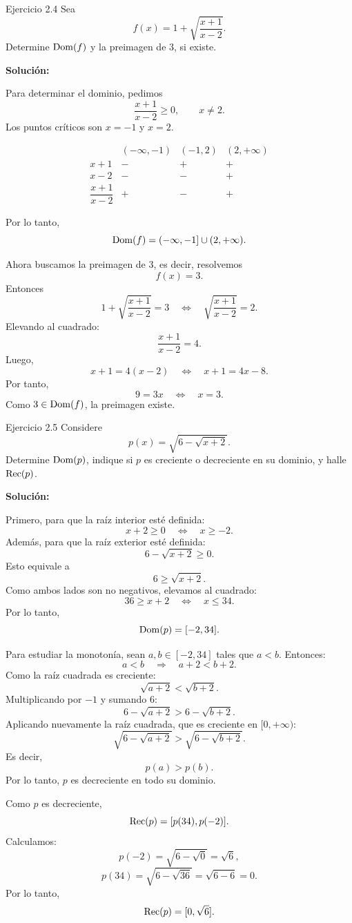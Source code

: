 \documentclass[letterpaper, 12pt]{article}
\begin{document}
\begin{solucionbox}{Ejercicio 2.4}
Sea
\[
    f(x)=1+\sqrt{\frac{x+1}{x-2}}.
\]
Determine $\operatorname{Dom}(f)$ y la preimagen de $3$, si existe.

\textbf{Soluci\'on:}

Para determinar el dominio, pedimos
\[
    \frac{x+1}{x-2}\geq 0,
    \qquad x\neq 2.
\]
Los puntos cr\'iticos son $x=-1$ y $x=2$.

\[
\begin{array}{c|ccc}
    & (-\infty,-1) & (-1,2) & (2,+\infty) \\ \hline
    x+1 & - & + & + \\
    x-2 & - & - & + \\ \hline
    \dfrac{x+1}{x-2} & + & - & +
\end{array}
\]

Por lo tanto,
\[
    \operatorname{Dom}(f)=(-\infty,-1]\cup(2,+\infty).
\]

Ahora buscamos la preimagen de $3$, es decir, resolvemos
\[
    f(x)=3.
\]
Entonces
\[
    1+\sqrt{\frac{x+1}{x-2}}=3
    \quad\Longleftrightarrow\quad
    \sqrt{\frac{x+1}{x-2}}=2.
\]
Elevando al cuadrado:
\[
    \frac{x+1}{x-2}=4.
\]
Luego,
\[
    x+1=4(x-2)
    \quad\Longleftrightarrow\quad
    x+1=4x-8.
\]
Por tanto,
\[
    9=3x
    \quad\Longleftrightarrow\quad
    x=3.
\]
Como $3\in\operatorname{Dom}(f)$, la preimagen existe.

\respuesta{$\Dom(f)=(-\infty,-1]\cup(2,+\infty)$ y la preimagen de $3$ es $x=3$.}
\end{solucionbox}

\begin{solucionbox}{Ejercicio 2.5}
Considere
\[
    p(x)=\sqrt{6-\sqrt{x+2}}.
\]
Determine $\operatorname{Dom}(p)$, indique si $p$ es creciente o decreciente en su dominio, y halle $\operatorname{Rec}(p)$.

\textbf{Soluci\'on:}

Primero, para que la ra\'iz interior est\'e definida:
\[
    x+2\geq 0
    \quad\Longleftrightarrow\quad
    x\geq -2.
\]
Adem\'as, para que la ra\'iz exterior est\'e definida:
\[
    6-\sqrt{x+2}\geq 0.
\]
Esto equivale a
\[
    6\geq \sqrt{x+2}.
\]
Como ambos lados son no negativos, elevamos al cuadrado:
\[
    36\geq x+2
    \quad\Longleftrightarrow\quad
    x\leq 34.
\]
Por lo tanto,
\[
    \operatorname{Dom}(p)=[-2,34].
\]

Para estudiar la monoton\'ia, sean $a,b\in[-2,34]$ tales que $a<b$. Entonces:
\[
    a<b
    \quad\Longrightarrow\quad
    a+2<b+2.
\]
Como la ra\'iz cuadrada es creciente:
\[
    \sqrt{a+2}<\sqrt{b+2}.
\]
Multiplicando por $-1$ y sumando $6$:
\[
    6-\sqrt{a+2}>6-\sqrt{b+2}.
\]
Aplicando nuevamente la ra\'iz cuadrada, que es creciente en $[0,+\infty)$:
\[
    \sqrt{6-\sqrt{a+2}}>
    \sqrt{6-\sqrt{b+2}}.
\]
Es decir,
\[
    p(a)>p(b).
\]
Por lo tanto, $p$ es decreciente en todo su dominio.

Como $p$ es decreciente,
\[
    \operatorname{Rec}(p)=[p(34),p(-2)].
\]
Calculamos:
\[
    p(-2)=\sqrt{6-\sqrt0}=\sqrt6,
\]
\[
    p(34)=\sqrt{6-\sqrt{36}}=\sqrt{6-6}=0.
\]
Por lo tanto,
\[
    \operatorname{Rec}(p)=[0,\sqrt6].
\]

\end{solucionbox}
\end{document}
